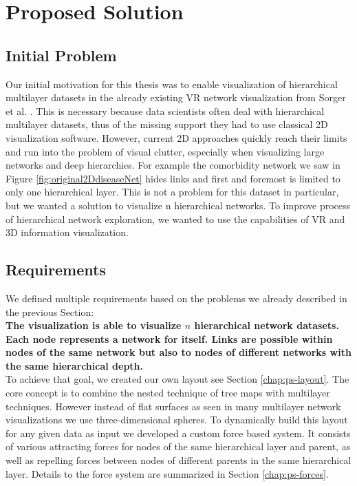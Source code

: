 \chapter{Proposed Solution}

\section{Initial Problem}

Our initial motivation for this thesis was to enable visualization of hierarchical multilayer datasets in the already existing VR network visualization from Sorger et al. \cite{sorger_immersive_2019}. This is necessary because data scientists often deal with hierarchical multilayer datasets, thus of the missing support they had to use classical 2D visualization software. 
However, current 2D approaches quickly reach their limits and run into the problem of visual clutter, especially when visualizing large networks and deep hierarchies. For example the comorbidity network we saw in Figure \ref{fig:original2DdiseaseNet} hides links and first and foremost is limited to only one hierarchical layer. This is not a problem for this dataset in particular, but we wanted a solution to visualize n hierarchical networks.
To improve process of hierarchical network exploration, we wanted to use the capabilities of VR and 3D information visualization. 

\section{Requirements}
\label{chap:ps-requirements}
We defined multiple requirements based on the problems we already described in the previous Section:\\
\textbf{The visualization is able to visualize $n$ hierarchical network datasets. Each node represents a network for itself. Links are possible within nodes of the same network but also to nodes of different networks with the same hierarchical depth.}\\
To achieve that goal, we created our own layout see Section \ref{chap:ps-layout}. The core concept is to combine the nested technique of tree maps with multilayer techniques. However instead of flat surfaces as seen in many multilayer network visualizations we use three-dimensional spheres. To dynamically build this layout for any given data as input we developed a custom force based system. It consists of various attracting forces for nodes of the same hierarchical layer and parent, as well as repelling forces between nodes of different parents in the same hierarchical layer. Details to the force system are summarized in Section \ref{chap:ps-forces}.

